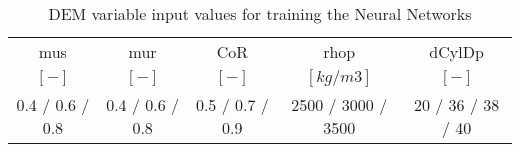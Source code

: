 \begin{table}[h]
\centering
\begin{tabular}{ccccc}
\hline
    \acs{mus} & \acs{mur} & \acs{CoR} & \acs{rhop} & \acs{dCylDp} \\
    	$[-]$  & $[-]$   & $[-]$   & $[kg/m3]$ & $[-]$ \\
    \hline
    0.4 / 0.6 / 0.8 & 0.4 / 0.6 / 0.8 & 0.5 / 0.7 / 0.9 & 2500 / 3000 / 3500 & 20 / 36 / 38 / 40 \\

\hline
\end{tabular}
\caption[DEM variable input values]{DEM variable input values for training the
Neural Networks}
\label{tab:10DEMVariableinputvalues}
\end{table}